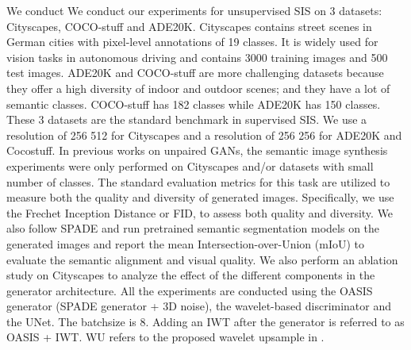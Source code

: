 \documentclass{article}
\begin{document}
    
 We conduct We conduct our experiments for unsupervised SIS on 3 datasets: Cityscapes\cite{cordts2016cityscapes}, COCO-stuff\cite{caesar2018coco} and ADE20K\cite{zhou2017scene}. Cityscapes contains street scenes in German cities with pixel-level annotations of 19 classes. It is widely used for vision tasks in autonomous driving and contains 3000 training images and 500 test images. ADE20K and COCO-stuff are more challenging datasets because they offer a high diversity of indoor and outdoor scenes; and they have a lot of semantic classes. COCO-stuff has 182 classes while ADE20K has 150 classes. These 3 datasets are the standard benchmark in supervised SIS. We use a resolution of 256  512 for Cityscapes and  a resolution of 256  256 for ADE20K and Cocostuff. In previous works on unpaired GANs, the semantic image synthesis experiments were only performed on Cityscapes and/or datasets with small number of classes. The standard evaluation metrics for this task are utilized to measure both the quality and diversity of generated images. Specifically, we use the Frechet Inception Distance or FID\cite{heuselttur2017}, to assess both quality and diversity. We also follow SPADE \cite{park2019semantic} and run pretrained semantic segmentation models \cite{yu2017dilated, chen2014semantic, xiao2018unified} on the generated images and report the mean Intersection-over-Union (mIoU) to evaluate the semantic alignment and visual quality. We also perform an ablation study on Cityscapes to analyze the effect of the different components in the generator architecture. All the experiments are conducted using the OASIS generator (SPADE generator + 3D noise), the wavelet-based discriminator and the UNet. The batchsize is 8. Adding an IWT after the generator is referred to as OASIS + IWT. WU refers to the proposed wavelet upsample in \cite{Tsai2006ImageUU}. 
\end{document}
